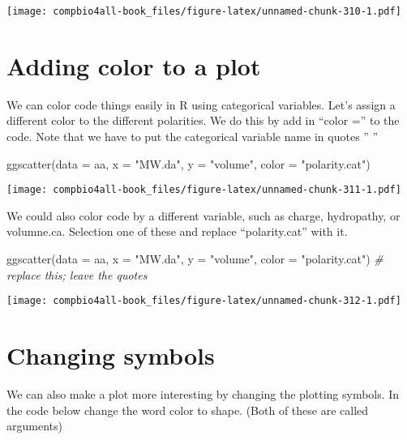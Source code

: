 \documentclass[
]{book}
\newenvironment{Shaded}{\begin{snugshade}}{\end{snugshade}}
\newcommand{\AttributeTok}[1]{\textcolor[rgb]{0.77,0.63,0.00}{#1}}
\newcommand{\CommentTok}[1]{\textcolor[rgb]{0.56,0.35,0.01}{\textit{#1}}}
\newcommand{\FunctionTok}[1]{\textcolor[rgb]{0.00,0.00,0.00}{#1}}
\newcommand{\NormalTok}[1]{#1}
\newcommand{\StringTok}[1]{\textcolor[rgb]{0.31,0.60,0.02}{#1}}
\begin{document}
\texttt{[image: compbio4all-book\_files/figure-latex/unnamed-chunk-310-1.pdf]}

\hypertarget{adding-color-to-a-plot}{%
\section{Adding color to a plot}\label{adding-color-to-a-plot}}

We can color code things easily in R using categorical variables. Let's assign a different color to the different polarities. We do this by add in ``color ='' to the code. Note that we have to put the categorical variable name in quotes '' ''

\begin{Shaded}
\begin{Highlighting}[]
\FunctionTok{ggscatter}\NormalTok{(}\AttributeTok{data =}\NormalTok{ aa, }
          \AttributeTok{x =} \StringTok{"MW.da"}\NormalTok{, }
          \AttributeTok{y =} \StringTok{"volume"}\NormalTok{,}
          \AttributeTok{color =} \StringTok{"polarity.cat"}\NormalTok{)}
\end{Highlighting}
\end{Shaded}

\texttt{[image: compbio4all-book\_files/figure-latex/unnamed-chunk-311-1.pdf]}

We could also color code by a different variable, such as charge, hydropathy, or volumne.ca. Selection one of these and replace ``polarity.cat'' with it.

\begin{Shaded}
\begin{Highlighting}[]
\FunctionTok{ggscatter}\NormalTok{(}\AttributeTok{data =}\NormalTok{ aa, }
          \AttributeTok{x =} \StringTok{"MW.da"}\NormalTok{, }
          \AttributeTok{y =} \StringTok{"volume"}\NormalTok{,}
          \AttributeTok{color =} \StringTok{"polarity.cat"}\NormalTok{) }\CommentTok{\# replace this; leave the quotes}
\end{Highlighting}
\end{Shaded}

\texttt{[image: compbio4all-book\_files/figure-latex/unnamed-chunk-312-1.pdf]}

\hypertarget{changing-symbols}{%
\section{Changing symbols}\label{changing-symbols}}

We can also make a plot more interesting by changing the plotting symbols. In the code below change the word color to shape. (Both of these are called arguments)
\end{document}
